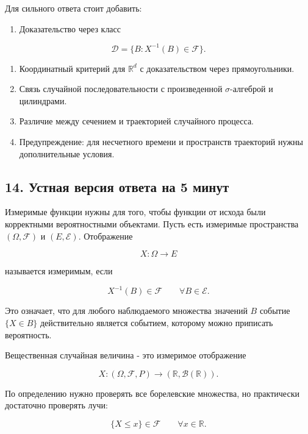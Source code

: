 \documentclass[
  11pt,
  a4paper,
]{article}
\providecommand{\tightlist}{%
  \setlength{\itemsep}{0pt}\setlength{\parskip}{0pt}}
\begin{document}
Для сильного ответа стоит добавить:

\begin{enumerate}
\def\labelenumi{\arabic{enumi}.}
\tightlist
\item
  Доказательство через класс
\end{enumerate}

\[
\mathcal D=\{B:X^{-1}(B)\in\mathcal F\}.
\]

\begin{enumerate}
\def\labelenumi{\arabic{enumi}.}
\setcounter{enumi}{1}
\tightlist
\item
  Координатный критерий для \(\mathbb R^d\) с доказательством через
  прямоугольники.
\item
  Связь случайной последовательности с произведенной \(\sigma\)-алгеброй
  и цилиндрами.
\item
  Различие между сечением и траекторией случайного процесса.
\item
  Предупреждение: для несчетного времени и пространств траекторий нужны
  дополнительные условия.
\end{enumerate}

\subsection{14. Устная версия ответа на 5
минут}\label{ux443ux441ux442ux43dux430ux44f-ux432ux435ux440ux441ux438ux44f-ux43eux442ux432ux435ux442ux430-ux43dux430-5-ux43cux438ux43dux443ux442}

Измеримые функции нужны для того, чтобы функции от исхода были
корректными вероятностными объектами. Пусть есть измеримые пространства
\((\Omega,\mathcal F)\) и \((E,\mathcal E)\). Отображение

\[
X:\Omega\to E
\]

называется измеримым, если

\[
X^{-1}(B)\in\mathcal F
\qquad \forall B\in\mathcal E.
\]

Это означает, что для любого наблюдаемого множества значений \(B\)
событие \(\{X\in B\}\) действительно является событием, которому можно
приписать вероятность.

Вещественная случайная величина - это измеримое отображение

\[
X:(\Omega,\mathcal F,P)\to(\mathbb R,\mathcal B(\mathbb R)).
\]

По определению нужно проверять все борелевские множества, но практически
достаточно проверять лучи:

\[
\{X\le x\}\in\mathcal F
\qquad \forall x\in\mathbb R.
\]
\end{document}
